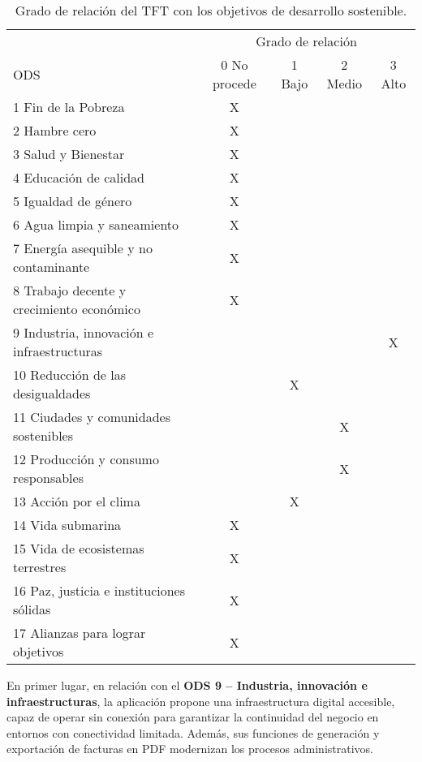 \begin{large}
\begin{table}[H]
\caption{Grado de relación del TFT con los objetivos de desarrollo sostenible.}
\label{tab:ODS}
\centering
\begin{tabular}{|l|c|c|c|c|}
\cline{1-5}
 & \multicolumn{4}{c|}{Grado de relación} \\ \cline{2-5}
ODS & 0 No procede & 1 Bajo & 2 Medio & 3 Alto \\ \cline{1-5}
1 Fin de la Pobreza                & X &   &   &   \\ \cline{1-5}
2 Hambre cero                      & X &   &   &   \\ \cline{1-5}
3 Salud y Bienestar                & X &   &   &   \\ \cline{1-5}
4 Educación de calidad             & X &   &   &   \\ \cline{1-5}
5 Igualdad de género               & X &   &   &   \\ \cline{1-5}
6 Agua limpia y saneamiento        & X &   &   &   \\ \cline{1-5}
7 Energía asequible y no contaminante & X &   &   &   \\ \cline{1-5}
8 Trabajo decente y crecimiento económico & X &   &   &   \\ \cline{1-5}
9 Industria, innovación e infraestructuras &   &   &   & X \\ \cline{1-5}
10 Reducción de las desigualdades  &   & X &   &   \\ \cline{1-5}
11 Ciudades y comunidades sostenibles &   &   & X &   \\ \cline{1-5}
12 Producción y consumo responsables &   &   & X &   \\ \cline{1-5} 
13 Acción por el clima             &   & X &   &   \\ \cline{1-5}
14 Vida submarina                  & X &   &   &   \\ \cline{1-5}
15 Vida de ecosistemas terrestres  & X &   &   &   \\ \cline{1-5}
16 Paz, justicia e instituciones sólidas & X &   &   &   \\ \cline{1-5}
17 Alianzas para lograr objetivos  & X &   &   &   \\ \cline{1-5}
\end{tabular}
\end{table}

En primer lugar, en relación con el \textbf{ODS 9 – Industria, innovación e infraestructuras}, la aplicación propone una infraestructura digital accesible, capaz de operar sin conexión para garantizar la continuidad del negocio en entornos con conectividad limitada. Además, sus funciones de generación y exportación de facturas en PDF modernizan los procesos administrativos. 


\end{large}
